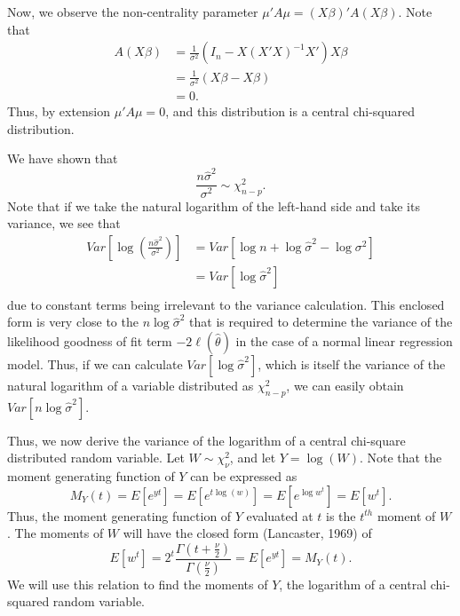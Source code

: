Now, we observe the non-centrality parameter $\mu 'A \mu = (X \beta)'A(X \beta)$. Note that
\begin{equation*}
	\begin{split}
	A(X \beta) & = \frac{1}{\sigma^2} (I_n - X (X' X)^{-1} X')X\beta  \\ 
	& = \frac{1}{\sigma^2} (X \beta - X \beta) \\
	& = 0 .
	\end{split}
\end{equation*}
Thus, by extension $\mu 'A \mu = 0$, and this distribution is a central chi-squared distribution.

We have shown that
\begin{equation}
	\frac{n \hat{\sigma}^2}{\sigma^2} \sim \chi^2_{n-p} .
\end{equation}
Note that if we take the natural logarithm of the left-hand side and take its variance, we see that
\begin{equation}
	\begin{split}
		Var \left[ \log(\frac{n \hat{\sigma}^2}{\sigma^2}) \right] & = Var \left[ \log n + \log \hat{\sigma}^2 - \log \sigma^2 \right]  \\ 
		& = Var \left[ \log \hat{\sigma}^2 \right] \\
	\end{split}
\end{equation}
due to constant terms being irrelevant to the variance calculation. This enclosed form is very close to the $n \log \hat{\sigma}^2$ that is required
to determine the variance of the likelihood goodness of fit term $-2 \ell (\hat{\theta} )$ in the case of a normal linear regression model.
Thus, if we can calculate $Var \left[ \log \hat{\sigma}^2 \right]$, which is itself the variance
of the natural logarithm of a variable distributed as $\chi^2_{n-p}$, we can easily obtain $Var \left[ n \log \hat{\sigma}^2 \right]$.

Thus, we now derive the variance of the logarithm of a central chi-square distributed random variable. Let $W \sim \chi^2_{\nu}$, and let $Y = \log(W)$. Note that
the moment generating function of $Y$ can be expressed as
\begin{equation*}
	M_Y (t) = E \left[ e^{yt} \right] = E \left[ e^{t\log(w)} \right] = E \left[ e^{\log w^t} \right] = E \left[ w^t \right] .
\end{equation*}
Thus, the moment generating function of $Y$ evaluated at $t$ is the $t^{th}$ moment of $W$. The moments of $W$ will have the
closed form (Lancaster, 1969) of
\begin{equation*}
	E \left[ w^t \right] = 2^t \frac{\Gamma (t + \frac{\nu}{2})}{\Gamma (\frac{\nu}{2})} = E \left[ e^{yt} \right] = M_Y (t) .
\end{equation*}
We will use this relation to find the moments of $Y$, the logarithm of a central chi-squared random variable.

